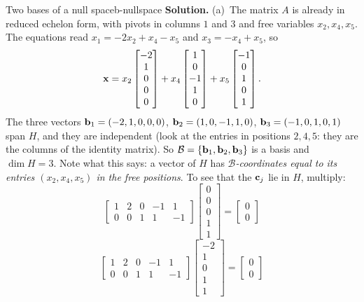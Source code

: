 \documentclass[11pt]{article}
\begin{document}
\begin{exmp}{Two bases of a null space}{b-nullspace}
\textbf{Solution.}
(a)~The matrix $A$ is already in reduced echelon form, with pivots in columns $1$ and $3$ and free variables $x_2,x_4,x_5$. The equations read $x_1=-2x_2+x_4-x_5$ and $x_3=-x_4+x_5$, so
\[
\mathbf{x}=x_2\begin{bmatrix}-2\\1\\0\\0\\0\end{bmatrix}+x_4\begin{bmatrix}1\\0\\-1\\1\\0\end{bmatrix}+x_5\begin{bmatrix}-1\\0\\1\\0\\1\end{bmatrix}.
\]
The three vectors $\mathbf{b}_1=(-2,1,0,0,0)$, $\mathbf{b}_2=(1,0,-1,1,0)$, $\mathbf{b}_3=(-1,0,1,0,1)$ span $H$, and they are independent (look at the entries in positions $2,4,5$: they are the columns of the identity matrix). So $\mathcal{B}=\{\mathbf{b}_1,\mathbf{b}_2,\mathbf{b}_3\}$ is a basis and $\dim H=3$. Note what this says: a vector of $H$ has \emph{$\mathcal{B}$-coordinates equal to its entries $(x_2,x_4,x_5)$ in the free positions}. To see that the $\mathbf{c}_j$ lie in $H$, multiply:
\[
\begin{bmatrix}1&2&0&-1&1\\0&0&1&1&-1\end{bmatrix}\begin{bmatrix}0\\0\\0\\1\\1\end{bmatrix}=\begin{bmatrix}0\\0\end{bmatrix}
\]
\[
\begin{bmatrix}1&2&0&-1&1\\0&0&1&1&-1\end{bmatrix}\begin{bmatrix}-2\\1\\0\\1\\1\end{bmatrix}=\begin{bmatrix}0\\0\end{bmatrix}
\]
\end{exmp}
\end{document}
